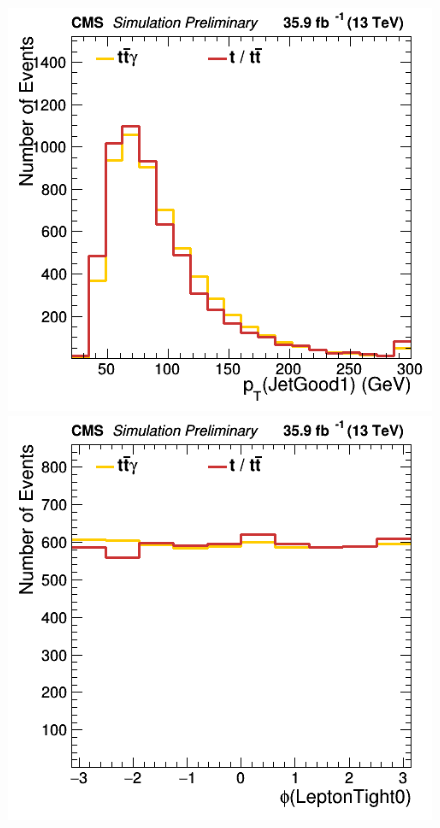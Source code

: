 \documentclass[11pt]{scrartcl}
\begin{document}
	\begin{figure}[H]
	\centering
	\begin{minipage}{.5\textwidth}
	  \centering
	  \includegraphics[width=0.75\linewidth]{figures/Notused/JetGood1_pt.png}
	\end{minipage}%
	\begin{minipage}{.5\textwidth}
	  \centering
	  \includegraphics[width=0.75\linewidth]{figures/Notused/LeptonTight0__phi.png}
	\end{minipage}
	\end{figure}
	
\end{document}
